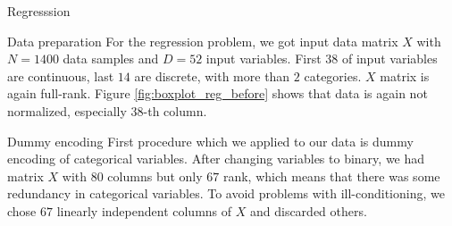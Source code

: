 \documentclass{article}
\begin{document}
\begin{section}{Regresssion}
\begin{subsection}{Data preparation}
For the regression problem, we got input data matrix $X$ with $N=1400$ data samples and $D = 52$ input variables. First $38$ of input variables are continuous, last $14$ are discrete, with more than $2$ categories. $X$ matrix is again full-rank. Figure \ref{fig:boxplot_reg_before} shows that data is again not normalized, especially $38$-th column. 

\begin{figure}[!h]
\center
{}
\hfill
{}
\caption{}
\end{figure}
\begin{subsubsection}{Dummy encoding}
First procedure which we applied to our data is dummy encoding of categorical variables. After changing variables to binary, we had matrix $X$ with $80$ columns but only $67$ rank, which means that there was some redundancy in categorical variables. To avoid problems with ill-conditioning, we chose $67$ linearly independent columns of $X$ and discarded others.
\end{subsubsection}


\end{subsection}
\end{section}
\end{document}

